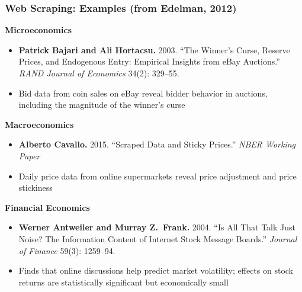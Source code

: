 \documentclass[10pt, aspectratio=1610, natbib, handout]{beamer}
\begin{document}
  \begin{frame}
    \frametitle{Web Scraping: Examples (from Edelman, 2012)}

    \textbf{Microeconomics}
    \begin{itemize}
      \item \textbf{Patrick Bajari and Ali Hortacsu.} 2003. ``The Winner's Curse, Reserve Prices, and Endogenous Entry: Empirical Insights from eBay Auctions.'' \textit{RAND Journal of Economics} 34(2): 329--55.
      \item Bid data from coin sales on eBay reveal bidder behavior in auctions, including the magnitude of the winner's curse
    \end{itemize}

    \vfill\pause

    \textbf{Macroeconomics}
    \begin{itemize}
      \item \textbf{Alberto Cavallo.} 2015. ``Scraped Data and Sticky Prices.'' \textit{NBER Working Paper}
      \item Daily price data from online supermarkets reveal price adjustment and price stickiness
    \end{itemize}

    \vfill\pause

    \textbf{Financial Economics}
    \begin{itemize}
      \item \textbf{Werner Antweiler and Murray Z.~Frank.} 2004. ``Is All That Talk Just Noise? The Information Content of Internet Stock Message Boards.'' \textit{Journal of Finance} 59(3): 1259--94.
      \item Finds that online discussions help predict market volatility; effects on stock returns are statistically significant but economically small
    \end{itemize}




\end{frame}
\end{document}
